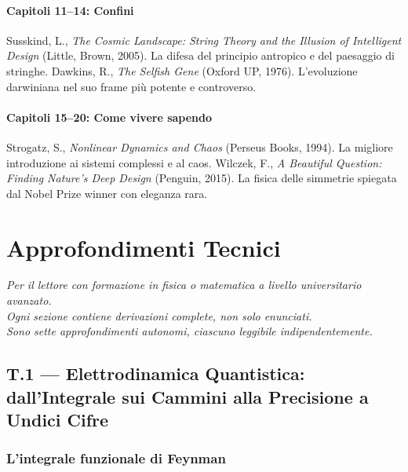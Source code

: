 \documentclass[11.5pt,a4paper,openany]{book}
\theoremstyle{remark}
\begin{document}
\subsection*{Capitoli 11--14: Confini}
Susskind, L., \textit{The Cosmic Landscape: String Theory and the Illusion of Intelligent Design} (Little, Brown, 2005). La difesa del principio antropico e del paesaggio di stringhe. Dawkins, R., \textit{The Selfish Gene} (Oxford UP, 1976). L'evoluzione darwiniana nel suo frame più potente e controverso.

\subsection*{Capitoli 15--20: Come vivere sapendo}
Strogatz, S., \textit{Nonlinear Dynamics and Chaos} (Perseus Books, 1994). La migliore introduzione ai sistemi complessi e al caos. Wilczek, F., \textit{A Beautiful Question: Finding Nature's Deep Design} (Penguin, 2015). La fisica delle simmetrie spiegata dal Nobel Prize winner con eleganza rara.

\clearpage

\part*{Approfondimenti Tecnici}

\begin{center}
{\itshape\small
Per il lettore con formazione in fisica o matematica a livello universitario avanzato.\\
Ogni sezione contiene derivazioni complete, non solo enunciati.\\
Sono sette approfondimenti autonomi, ciascuno leggibile indipendentemente.}
\end{center}

\bigskip

\chapter*{T.1 — Elettrodinamica Quantistica: dall'Integrale sui Cammini alla Precisione a Undici Cifre}

\section{L'integrale funzionale di Feynman}
\end{document}
